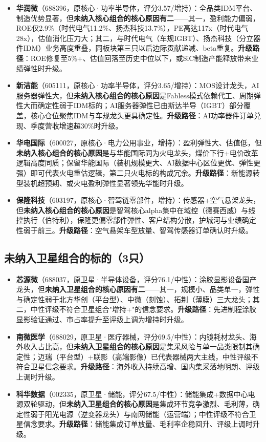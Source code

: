\vspace{0.2em}
\begin{itemize}[leftmargin=2em]
\item \textbf{华润微}（688396，原核心·功率半导体，评分3.57/增持）：全品类IDM平台、制造优势显著，但\textbf{未纳入核心组合的核心原因有二}——其一，盈利能力偏弱，ROE仅2.9\%（时代电气11.2\%、扬杰科技13.7\%），PE高达117x（时代电气28x），估值消化压力大；其二，与时代电气（车规IGBT）、扬杰科技（分立器件IDM）业务高度重叠，同板块第三只以后边际贡献递减、beta重复。\textbf{升级路径}：ROE修复至5\%+、估值回落至历史中位以下，或SiC制造产能释放带来业绩弹性时升级。
\item \textbf{新洁能}（605111，原核心·功率半导体，评分3.65/增持）：MOS设计龙头，AI服务器弹性大，但\textbf{未纳入核心组合的核心原因}是Fabless模式依赖代工、周期弹性大而确定性弱于IDM标的；AI服务器弹性已由斯达半导（IGBT）部分覆盖，核心仓位聚焦IDM与车规龙头更具确定性。\textbf{升级路径}：AI功率器件订单兑现、季度营收增速超30\%时升级。
\item \textbf{华电国际}（600027，原核心·电力公用事业，增持）：盈利弹性大、估值低，但\textbf{未纳入核心组合的核心原因}是与华能国际同为火电龙头，煤价下行+电价改革逻辑高度同质；保留华能国际（装机规模更大、AI数据中心区位更优、弹性更强）即可代表火电重估逻辑，第二只火电标的构成冗余。\textbf{升级路径}：新能源转型装机超预期、或火电盈利弹性显著领先华能时升级。
\item \textbf{保隆科技}（603197，原核心·智驾链零部件，增持）：传感器+空气悬架龙头，但\textbf{未纳入核心组合的核心原因}是智驾核心alpha集中在域控（德赛西威）与线控执行（伯特利），保隆更偏零部件弹性、客户结构分散，护城河与业绩确定性弱于前三。\textbf{升级路径}：空气悬架车型放量、智驾传感器订单确认时升级。
\end{itemize}

\subsection{未纳入卫星组合的标的（3只）}

\vspace{0.2em}
\begin{itemize}[leftmargin=2em]
\item \textbf{芯源微}（688037，原卫星·半导体设备，评分76.1/中性）：涂胶显影设备国产龙头，但\textbf{未纳入卫星组合的核心原因有二}——其一，规模小、品类单一，弹性与确定性弱于北方华创（平台型）、中微（刻蚀）、拓荆（薄膜）三大龙头；其二，中性评级不符合卫星组合"增持+"的信念要求。\textbf{升级路径}：先进制程涂胶显影验证通过、市占率提升至评级上调为增持时升级。
\item \textbf{南微医学}（688029，原卫星·医疗器械，评分69.5/中性）：内镜耗材龙头、海外收入占比高，但\textbf{未纳入卫星组合的核心原因}是集采风险与单一品类限制其确定性；迈瑞（平台型）+联影（高端影像）已代表器械两大主线，中性评级不符合卫星信念要求。\textbf{升级路径}：海外收入持续高增、国内集采落地明朗、评级上调时升级。
\item \textbf{科华数据}（002335，原卫星·储能，评分67.5/中性）：储能集成+数据中心电源双轮驱动，但\textbf{未纳入卫星组合的核心原因}是集成环节竞争激烈、毛利薄，确定性弱于阳光电源（逆变器龙头）与南网储能（运营端）；中性评级不符合卫星信念要求。\textbf{升级路径}：储能集成订单放量、毛利率企稳回升、评级上调时升级。
\end{itemize}

